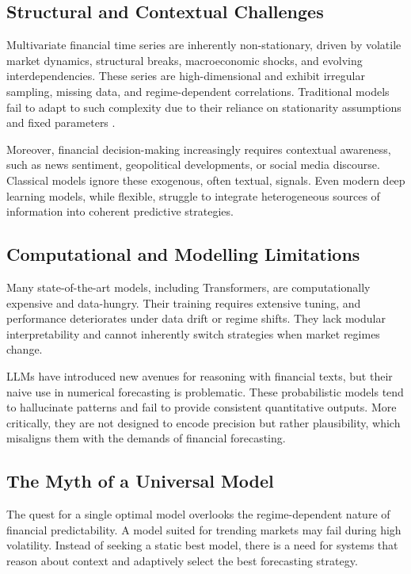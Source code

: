 \documentclass[conference]{IEEEtran}
\begin{document}
\subsection{Structural and Contextual Challenges}
Multivariate financial time series are inherently non-stationary, driven by volatile market dynamics, structural breaks, macroeconomic shocks, and evolving interdependencies. These series are high-dimensional and exhibit irregular sampling, missing data, and regime-dependent correlations. Traditional models fail to adapt to such complexity due to their reliance on stationarity assumptions and fixed parameters \cite{bai1998bai}.

Moreover, financial decision-making increasingly requires contextual awareness, such as news sentiment, geopolitical developments, or social media discourse. Classical models ignore these exogenous, often textual, signals. Even modern deep learning models, while flexible, struggle to integrate heterogeneous sources of information into coherent predictive strategies.

\subsection{Computational and Modelling Limitations}
Many state-of-the-art models, including Transformers, are computationally expensive and data-hungry. Their training requires extensive tuning, and performance deteriorates under data drift or regime shifts. They lack modular interpretability and cannot inherently switch strategies when market regimes change.

LLMs have introduced new avenues for reasoning with financial texts, but their naive use in numerical forecasting is problematic. These probabilistic models tend to hallucinate patterns and fail to provide consistent quantitative outputs. More critically, they are not designed to encode precision but rather plausibility, which misaligns them with the demands of financial forecasting.

\subsection{The Myth of a Universal Model}
The quest for a single optimal model overlooks the regime-dependent nature of financial predictability. A model suited for trending markets may fail during high volatility. Instead of seeking a static best model, there is a need for systems that reason about context and adaptively select the best forecasting strategy.
\end{document}
